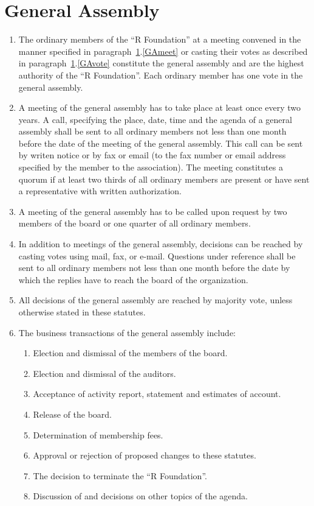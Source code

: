 \documentclass[a4paper]{article}
\newcommand{\RF}{``R Foundation''}
\begin{document}
\section{General Assembly}
\label{GA}


\begin{enumerate}
 \item The ordinary members of the \RF{} at a meeting convened in the
  manner specified in paragraph~\ref{GA}.\ref{GAmeet} or casting their
  votes as described in paragraph~\ref{GA}.\ref{GAvote} constitute the
  general assembly and are the highest authority of the \RF{}. Each
  ordinary member has one vote in the general assembly.
  
 \item \label{GAmeet} A meeting of the general assembly has to take
  place at least once every two years. A call, specifying the place,
  date, time and the agenda of a general assembly shall be sent to all
  ordinary members not less than one month before the date of the
  meeting of the general assembly. This call can be sent by writen
  notice or by fax or email (to the fax number or email address
  specified by the member to the association).  The meeting
  constitutes a quorum if at least two thirds of all ordinary members
  are present or have sent a representative with written authorization.
  
 \item A meeting of the general assembly has to be called upon request
  by two members of the board or one quarter of all ordinary members. 
  
  \item \label{GAvote}
   In addition to meetings of the general assembly, decisions can
  be reached by casting votes using mail, fax, or e-mail. Questions
  under reference shall be sent to all ordinary members not less than
  one month before the date by which the replies have to reach the
  board of the organization.
  
 \item All decisions of the general assembly are reached by majority
  vote, unless otherwise stated in these statutes.
  
 \item The business transactions of the general assembly include:
  \begin{enumerate}
   \item Election and dismissal of the members of the board.
   \item Election and dismissal of the auditors.
   \item Acceptance of activity report, statement and estimates of
    account.
   \item Release of the board.
   \item Determination of membership fees.
   \item Approval or rejection of proposed changes to these statutes.
   \item The decision to terminate the \RF{}.
   \item Discussion of and decisions on other topics of the agenda.
  \end{enumerate}
\end{enumerate}
\end{document}
